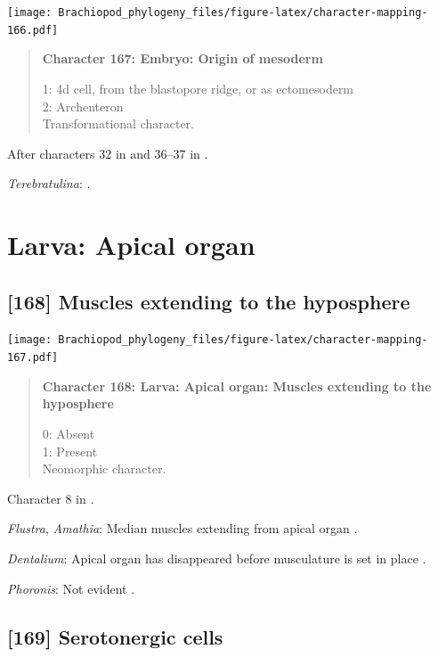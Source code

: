 \documentclass[openany]{book}
\begin{document}
\texttt{[image: Brachiopod\_phylogeny\_files/figure-latex/character-mapping-166.pdf]}

\begin{quote}
\textbf{Character 167: Embryo: Origin of mesoderm}

1: 4d cell, from the blastopore ridge, or as ectomesoderm\\
2: Archenteron\\
Transformational character.
\end{quote}

After characters 32 in \citet{Grobe2007} and 36--37 in
\citet{Glenner2004}.

\hypertarget{Terebratulina-coding-167}{}
\emph{Terebratulina}: \citet{Williams1997Introduction}.

\section{Larva: Apical organ}\label{larva-apical-organ}

\subsection*{{[}168{]} Muscles extending to the
hyposphere}\label{muscles-extending-to-the-hyposphere}

\texttt{[image: Brachiopod\_phylogeny\_files/figure-latex/character-mapping-167.pdf]}

\begin{quote}
\textbf{Character 168: Larva: Apical organ: Muscles extending to the
hyposphere}

0: Absent\\
1: Present\\
Neomorphic character.
\end{quote}

Character 8 in \citet{Vinther2008}.

\hypertarget{Amathia-coding-168}{}
\emph{Flustra}, \emph{Amathia}: Median muscles extending from apical
organ \citep{Gruhl2008}.

\hypertarget{Dentalium-coding-168}{}
\emph{Dentalium}: Apical organ has disappeared before musculature is set
in place \citep{Wanninger2002M}.

\hypertarget{Phoronis-coding-168}{}
\emph{Phoronis}: Not evident \citep[fig. 2C]{Santagata2004}.

\subsection*{{[}169{]} Serotonergic cells}\label{serotonergic-cells}
\end{document}
